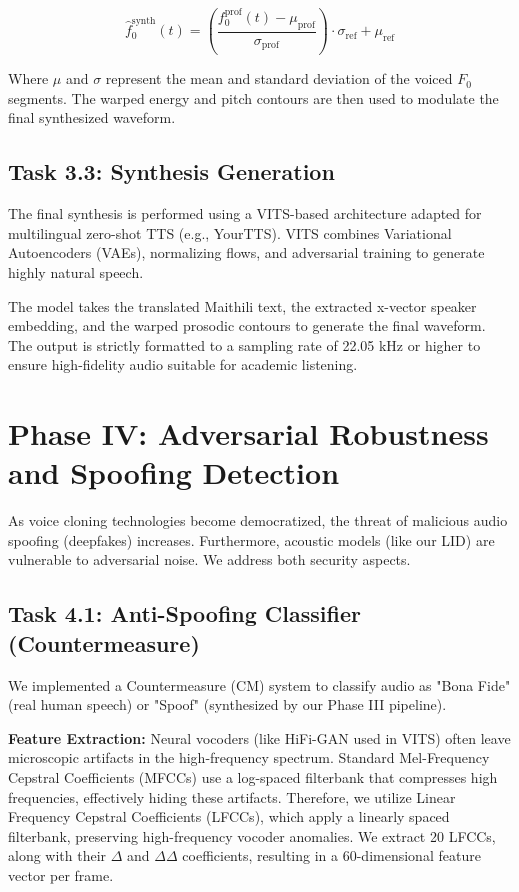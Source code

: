 \documentclass[conference]{IEEEtran}
\begin{document}
\begin{equation}
\hat{f}_0^{\text{synth}}(t) = \left( \frac{f_0^{\text{prof}}(t) - \mu_{\text{prof}}}{\sigma_{\text{prof}}} \right) \cdot \sigma_{\text{ref}} + \mu_{\text{ref}}
\end{equation}

Where $\mu$ and $\sigma$ represent the mean and standard deviation of the voiced $F_0$ segments. The warped energy and pitch contours are then used to modulate the final synthesized waveform.

\subsection{Task 3.3: Synthesis Generation}

The final synthesis is performed using a VITS-based architecture adapted for multilingual zero-shot TTS (e.g., YourTTS). VITS combines Variational Autoencoders (VAEs), normalizing flows, and adversarial training to generate highly natural speech. 

The model takes the translated Maithili text, the extracted x-vector speaker embedding, and the warped prosodic contours to generate the final waveform. The output is strictly formatted to a sampling rate of 22.05 kHz or higher to ensure high-fidelity audio suitable for academic listening.

\section{Phase IV: Adversarial Robustness and Spoofing Detection}

As voice cloning technologies become democratized, the threat of malicious audio spoofing (deepfakes) increases. Furthermore, acoustic models (like our LID) are vulnerable to adversarial noise. We address both security aspects.

\subsection{Task 4.1: Anti-Spoofing Classifier (Countermeasure)}

We implemented a Countermeasure (CM) system to classify audio as "Bona Fide" (real human speech) or "Spoof" (synthesized by our Phase III pipeline).

\textbf{Feature Extraction:} Neural vocoders (like HiFi-GAN used in VITS) often leave microscopic artifacts in the high-frequency spectrum. Standard Mel-Frequency Cepstral Coefficients (MFCCs) use a log-spaced filterbank that compresses high frequencies, effectively hiding these artifacts. Therefore, we utilize Linear Frequency Cepstral Coefficients (LFCCs), which apply a linearly spaced filterbank, preserving high-frequency vocoder anomalies. We extract 20 LFCCs, along with their $\Delta$ and $\Delta\Delta$ coefficients, resulting in a 60-dimensional feature vector per frame.
\end{document}
